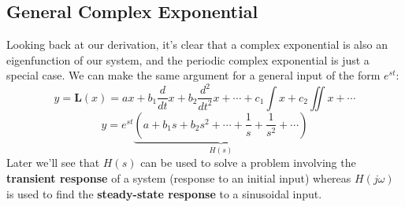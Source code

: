 \subsection{General Complex Exponential}
Looking back at our derivation, it's clear that a complex exponential is also an eigenfunction of our system, and the periodic complex exponential is just a special case.  We can make the same argument for a general input of the form $e^{st}$:
    \begin{equation}
        y = \mathbf{L}(x) = a x + b_1 \frac{d}{dt} x + b_2\frac{d^2}{dt^2} x + \cdots + c_1 \int x + c_2 \iint x + \cdots
    \end{equation}
    \begin{equation}
        y =  e^{s t} \underbrace{\left(a + b_1 s  + b_2 s^2  + \cdots + \frac{1}{ s} + \frac{1}{ s^2} + \cdots \right)}_{H(s)}
    \end{equation}
Later we'll see that $H(s)$ can be used to solve a problem involving the \textbf{transient response} of a system (response to an initial input) whereas $H(j\omega)$ is used to find the \textbf{steady-state response} to a sinusoidal input.

